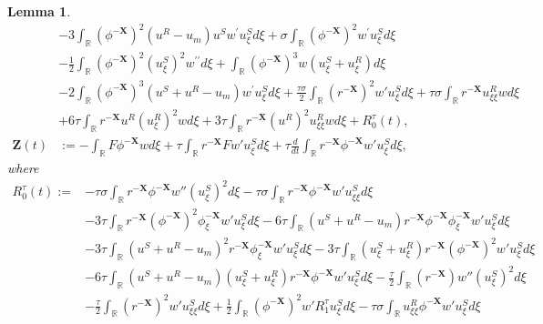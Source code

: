\documentclass[10pt,reqno]{amsart}
\numberwithin{equation}{section}
\newtheorem{lemma}[theorem]{Lemma}
\begin{document}
\begin{lemma}
\begin{equation*}
\begin{aligned}
				&-3\int_{\mathbb{R}}\left(\phi^{-\mathbf{X}}\right)^{2}\left(u^{R}-u_{m}\right) u^{S} w^{\prime} u_{\xi}^{S} d \xi+\sigma \int_{\mathbb{R}}\left(\phi^{-\mathbf{X}}\right)^{2} w^{\prime} u_{\xi}^{S} d \xi\\
				&-\frac{1}{2} \int_{\mathbb{R}}\left(\phi^{-\mathbf{X}}\right)^{2} \left(u_{\xi}^{S}\right)^{2} w^{\prime \prime} d \xi+\int_{\mathbb{R}}\left(\phi^{-\mathbf{X}}\right)^{3} w\left(u_{\xi}^{S}+u_{\xi}^{R}\right) d \xi\\
				&-2\int_{\mathbb{R}}\left(\phi^{-\mathbf{X}}\right)^{3}\left(u^{S}+u^{R}-u_{m}\right) w^{\prime} u_{\xi}^{S} d \xi+\frac{\tau\sigma}{2}\int_{\mathbb{R}}\left(r^{-\mathbf{X}}\right)^{2}w'u_{\xi}^{S}d\xi+\tau\sigma\int_{\mathbb{R}}r^{-\mathbf{X}}u_{\xi\xi}^Rwd\xi\\
				&+6\tau\int_{\mathbb{R}}r^{-\mathbf{X}}u^R(u_{\xi}^R)^2wd\xi+3\tau\int_{\mathbb{R}}r^{-\mathbf{X}}(u^R)^2u_{\xi\xi}^Rwd\xi+R_{0}^{\tau}(t), \\
				\mathbf{Z}(t)&:=- \int_{\mathbb{R}} F \phi^{-\mathbf{X}} w d\xi+\tau\int_{\mathbb{R}}r^{-\mathbf{X}}Fw'u_{\xi}^{S}d\xi+\tau\frac{d}{dt}\int_{\mathbb{R}}r^{-\mathbf{X}}\phi^{-\mathbf{X}}w'u_{\xi}^{S}d\xi,
			\end{aligned}
		\end{equation*}
		where
		\begin{equation}
			\begin{aligned}
				R_{0}^{\tau}(t):=&- \tau\sigma\int_{\mathbb{R}}r^{-\mathbf{X}}\phi^{-\mathbf{X}}w''\left(u_{\xi}^{S}\right)^{2}d\xi-\tau\sigma\int_{\mathbb{R}}r^{-\mathbf{X}}\phi^{-\mathbf{X}}w'u^S_{\xi\xi}d\xi\\
				&-3\tau\int_{\mathbb{R}}r^{-\mathbf{X}}(\phi^{-\mathbf{X}})^{2}\phi_{\xi}^{-\mathbf{X}}w'u_{\xi}^{S}d\xi -6\tau\int_{\mathbb{R}}(u^{S}+u^{R}-u_{m})r^{-\mathbf{X}}\phi^{-\mathbf{X}}\phi_{\xi}^{-\mathbf{X}}w'u_{\xi}^{S}d\xi\\
				&-3\tau\int_{\mathbb{R}}(u^{S}+u^{R}-u_{m})^{2}r^{-\mathbf{X}}\phi_{\xi}^{-\mathbf{X}}w'u_{\xi}^{S}d\xi-3\tau\int_{\mathbb{R}}(u_{\xi}^{S}+u_{\xi}^{R})r^{-\mathbf{X}}(\phi^{-\mathbf{X}})^{2}w'u_{\xi}^{S}d\xi\\
				&-6\tau\int_{\mathbb{R}}(u^{S}+u^{R}-u_{m})(u_{\xi}^{S}+u_{\xi}^{R})r^{-\mathbf{X}}\phi^{-\mathbf{X}}w'u_{\xi}^{S}d\xi-\frac{\tau}{2}\int_{\mathbb{R}}(r^{-\mathbf{X}})w''(u_{\xi}^{S})^{2}d\xi\\
				&-\frac{\tau}{2}\int_{\mathbb{R}}(r^{-\mathbf{X}})^{2}w'u_{\xi\xi}^Sd\xi+\frac{1}{2}\int_{\mathbb{R}}(\phi^{-\mathbf{X}})^{2}w'R_{1}^{\tau}u_{\xi}^{S}d\xi-\tau\sigma\int_{\mathbb{R}}u_{\xi\xi}^R\phi^{-\mathbf{X}}w'u_{\xi}^Sd\xi\\

\end{aligned}
\end{equation}
\end{lemma}
\end{document}
